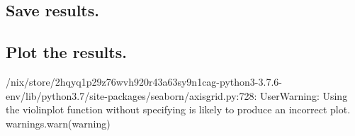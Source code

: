 \documentclass[letterpaper,10pt,english]{sphinxmanual}
\begin{document}
\subsection{Save results.}
\label{\detokenize{ioc-1:save-results-1}}
\begin{sphinxVerbatim}[commandchars=\\\{\}]
\end{sphinxVerbatim}

\begin{sphinxVerbatim}[commandchars=\\\{\}]
\end{sphinxVerbatim}


\subsection{Plot the results.}
\label{\detokenize{ioc-1:plot-the-results-1}}
\begin{sphinxVerbatim}[commandchars=\\\{\}]
\end{sphinxVerbatim}



\begin{sphinxVerbatim}[commandchars=\\\{\}]
  
      
      
      
      
\end{sphinxVerbatim}
\begin{sphinxalltt}
/nix/store/2hqyq1p29z76wvh920r43a63sy9n1cag-python3-3.7.6-env/lib/python3.7/site-packages/seaborn/axisgrid.py:728: UserWarning: Using the violinplot function without specifying  is likely to produce an incorrect plot.
  warnings.warn(warning)
\end{sphinxalltt}
\end{document}
